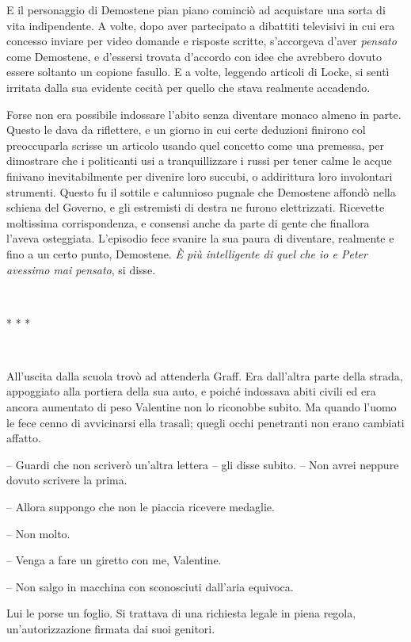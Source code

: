 {E il personaggio di Demostene pian piano cominciò ad acquistare una
	sorta di vita indipendente. A volte, dopo aver partecipato a dibattiti
	televisivi in cui era concesso inviare per video domande e risposte
	scritte, s'accorgeva d'aver \emph{pensato} come Demostene, e d'essersi
	trovata d'accordo con idee che avrebbero dovuto essere soltanto un
	copione fasullo. E a volte, leggendo articoli di Locke, si sentì
	irritata dalla sua evidente cecità per quello che stava realmente
	accadendo.}

{Forse non era possibile indossare l'abito senza diventare monaco almeno
	in parte. Questo le dava da riflettere, e un giorno in cui certe
	deduzioni finirono col preoccuparla scrisse un articolo usando quel
	concetto come una premessa, per dimostrare che i politicanti usi a
	tranquillizzare i russi per tener calme le acque finivano
	inevitabilmente per divenire loro succubi, o addirittura loro
	involontari strumenti. Questo fu il sottile e calunnioso pugnale che
	Demostene affondò nella schiena del Governo, e gli estremisti di destra
	ne furono elettrizzati. Ricevette moltissima corrispondenza, e consensi
	anche da parte di gente che finallora l'aveva osteggiata. L'episodio
	fece svanire la sua paura di diventare, realmente e fino a un certo
	punto, Demostene. \emph{È più intelligente di quel che io e Peter
		avessimo mai pensato}, \emph{} si disse.}

{~}

\begin{center}
	{* * *}
\end{center}

{~}

{All'uscita dalla scuola trovò ad attenderla Graff. Era dall'altra parte
	della strada, appoggiato alla portiera della sua auto, e poiché
	indossava abiti civili ed era ancora aumentato di peso Valentine non lo
	riconobbe subito. Ma quando l'uomo le fece cenno di avvicinarsi ella
	trasalì; quegli occhi penetranti non erano cambiati affatto.}

{-- Guardi che non scriverò un'altra lettera -- gli disse subito. -- Non
	avrei neppure dovuto scrivere la prima.}

{-- Allora suppongo che non le piaccia ricevere medaglie.}

{-- Non molto.}

{-- Venga a fare un giretto con me, Valentine.}

{-- Non salgo in macchina con sconosciuti dall'aria equivoca.}

{Lui le porse un foglio. Si trattava di una richiesta legale in piena
	regola, un'autorizzazione firmata dai suoi genitori.}

